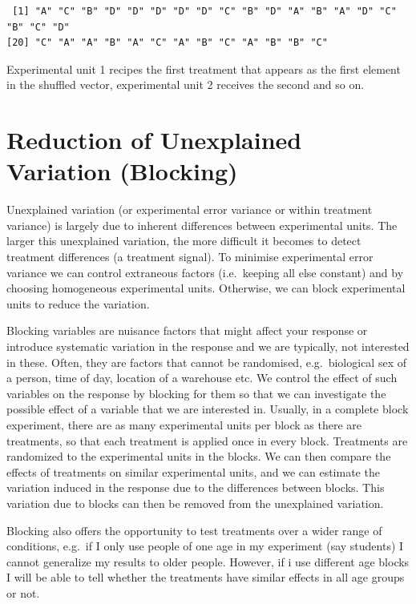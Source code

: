 \documentclass[
  letterpaper,
]{book}
\begin{document}
\begin{verbatim}
 [1] "A" "C" "B" "D" "D" "D" "D" "D" "C" "B" "D" "A" "B" "A" "D" "C" "B" "C" "D"
[20] "C" "A" "A" "B" "A" "C" "A" "B" "C" "A" "B" "B" "C"
\end{verbatim}

Experimental unit 1 recipes the first treatment that appears as the
first element in the shuffled vector, experimental unit 2 receives the
second and so on.

\section*{Reduction of Unexplained Variation
(Blocking)}\label{reduction-of-unexplained-variation-blocking}


Unexplained variation (or experimental error variance or within
treatment variance) is largely due to inherent differences between
experimental units. The larger this unexplained variation, the more
difficult it becomes to detect treatment differences (a treatment
signal). To minimise experimental error variance we can control
extraneous factors (i.e.~keeping all else constant) and by choosing
homogeneous experimental units. Otherwise, we can block experimental
units to reduce the variation.

Blocking variables are nuisance factors that might affect your response
or introduce systematic variation in the response and we are typically,
not interested in these. Often, they are factors that cannot be
randomised, e.g.~biological sex of a person, time of day, location of a
warehouse etc. We control the effect of such variables on the response
by blocking for them so that we can investigate the possible effect of a
variable that we are interested in. Usually, in a complete block
experiment, there are as many experimental units per block as there are
treatments, so that each treatment is applied once in every block.
Treatments are randomized to the experimental units in the blocks. We
can then compare the effects of treatments on similar experimental
units, and we can estimate the variation induced in the response due to
the differences between blocks. This variation due to blocks can then be
removed from the unexplained variation.

Blocking also offers the opportunity to test treatments over a wider
range of conditions, e.g.~if I only use people of one age in my
experiment (say students) I cannot generalize my results to older
people. However, if i use different age blocks I will be able to tell
whether the treatments have similar effects in all age groups or not.
\end{document}
